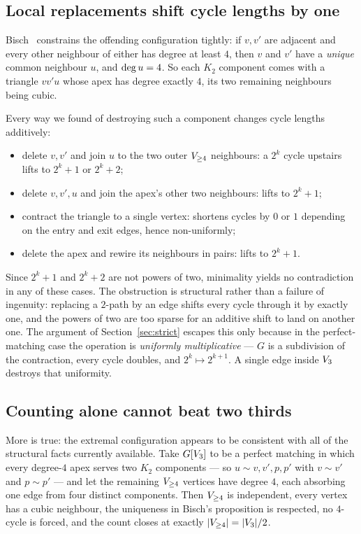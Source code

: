 \documentclass[11pt,a4paper]{article}
\begin{document}
\subsection*{Local replacements shift cycle lengths by one}

Bisch~\cite{Bisch} constrains the offending configuration tightly: if $v, v'$ are adjacent
and every other neighbour of either has degree at least $4$, then $v$ and $v'$ have a
\emph{unique} common neighbour $u$, and $\operatorname{deg} u = 4$. So each $K_2$ component comes
with a triangle $v v' u$ whose apex has degree exactly $4$, its two remaining neighbours
being cubic.

Every way we found of destroying such a component changes cycle lengths additively:

\begin{itemize}[nosep]
  \item delete $v, v'$ and join $u$ to the two outer $V_{\ge 4}$ neighbours: a $2^k$ cycle
        upstairs lifts to $2^k + 1$ or $2^k + 2$;
  \item delete $v, v', u$ and join the apex's other two neighbours: lifts to $2^k+1$;
  \item contract the triangle to a single vertex: shortens cycles by $0$ or $1$ depending
        on the entry and exit edges, hence non-uniformly;
  \item delete the apex and rewire its neighbours in pairs: lifts to $2^k+1$.
\end{itemize}

Since $2^k + 1$ and $2^k+2$ are not powers of two, minimality yields no contradiction in
any of these cases. The obstruction is structural rather than a failure of ingenuity:
replacing a $2$-path by an edge shifts every cycle through it by exactly one, and the
powers of two are too sparse for an additive shift to land on another one. The argument of
Section~\ref{sec:strict} escapes this only because in the perfect-matching case the
operation is \emph{uniformly multiplicative} --- $G$ is a subdivision of the contraction,
every cycle doubles, and $2^k \mapsto 2^{k+1}$. A single edge inside $V_{3}$ destroys
that uniformity.

\subsection*{Counting alone cannot beat two thirds}

More is true: the extremal configuration appears to be consistent with all of the
structural facts currently available. Take $G[V_{3}]$ to be a perfect matching in which
every degree-$4$ apex serves two $K_2$ components --- so $u \sim v, v', p, p'$ with
$v \sim v'$ and $p \sim p'$ --- and let the remaining $V_{\ge 4}$ vertices have degree $4$,
each absorbing one edge from four distinct components. Then $V_{\ge 4}$ is independent, every
vertex has a cubic neighbour, the uniqueness in Bisch's proposition is respected, no
$4$-cycle is forced, and the count closes at exactly $\lvert V_{\ge 4} \rvert = \lvert V_{3} \rvert/2$.
\end{document}

